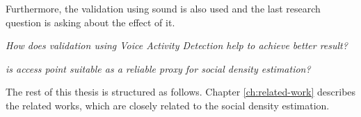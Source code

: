 Furthermore, the validation using sound is also used and the last research question is asking about the effect of it.
\begin{displayquote}\textit{
How does validation using Voice Activity Detection help to achieve better result?}
\end{displayquote}

\begin{displayquote}
	\textit{is access point suitable as a reliable proxy for social density estimation?}
\end{displayquote}

The rest of this thesis is structured as follows. Chapter \ref{ch:related-work} describes the related works, which are closely related to the social density estimation.






